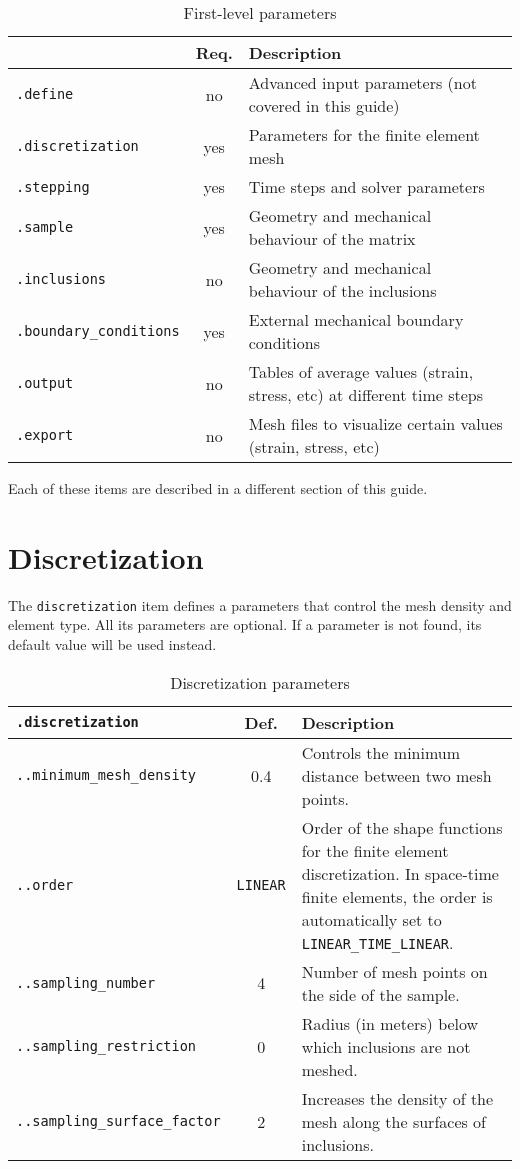 \documentclass[10pt]{article}
\begin{document}
\begin{table}[h!]
\begin{tabular}{lcl}
 & Req. & Description \\
\hline
\verb+.define+ & no & Advanced input parameters (not covered in this guide) \\
\verb+.discretization+ & yes & Parameters for the finite element mesh \\
\verb+.stepping+ & yes & Time steps and solver parameters\\
\verb+.sample+ & yes & Geometry and mechanical behaviour of the matrix \\
\verb+.inclusions+ & no & Geometry and mechanical behaviour of the inclusions \\
\verb+.boundary_conditions+ & yes & External mechanical boundary conditions \\
\verb+.output+ & no & Tables of average values (strain, stress, etc) at different time steps \\
\verb+.export+ & no & Mesh files to visualize certain values (strain, stress, etc)\\
\hline
\end{tabular}
\caption{First-level parameters}
\end{table}

Each of these items are described in a different section of this guide.\\

\section{Discretization}

The \verb+discretization+ item defines a parameters that control the mesh density and element type.
All its parameters are optional.
If a parameter is not found, its default value will be used instead.\\

\begin{table}[h!]
\begin{tabularx}{\textwidth}{lcX}
\verb+.discretization+ &  Def. & Description \\
\hline
\verb+..minimum_mesh_density+ & 0.4 & Controls the minimum distance between two mesh points. \\
\verb+..order+ & \verb+LINEAR+ & Order of the shape functions for the finite element discretization. In space-time finite elements, the order is automatically set to \verb+LINEAR_TIME_LINEAR+.\\
\verb+..sampling_number+ & 4 & Number of mesh points on the side of the sample. \\
\verb+..sampling_restriction+ & 0 & Radius (in meters) below which inclusions are not meshed.\\
\verb+..sampling_surface_factor+ & 2 & Increases the density of the mesh along the surfaces of inclusions. \\
\hline
\end{tabularx}
\caption{Discretization parameters}
\end{table}
\end{document}
